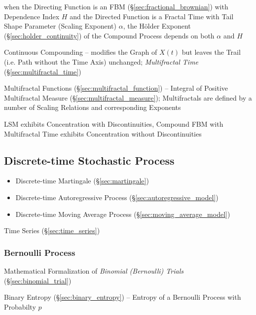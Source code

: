when the Directing Function is an FBM (\S\ref{sec:fractional_brownian}) with
Dependence Index $H$ and the Directed Function is a Fractal Time with Tail Shape
Parameter (Scaling Exponent) $\alpha$, the H\"older Exponent
(\S\ref{sec:holder_continuity}) of the Compound Process depends on both $\alpha$
and $H$

Continuous Compounding -- modifies the Graph of $X(t)$ but leaves the Trail
(i.e. Path without the Time Axis) unchanged; \emph{Multifractal Time}
(\S\ref{sec:multifractal_time})

Multifractal Functions (\S\ref{sec:multifractal_function}) -- Integral of
Positive Multifractal Measure (\S\ref{sec:multifractal_measure}); Multifractals
are defined by a number of Scaling Relations and corresponding Exponents

LSM exhibits Concentration with Discontinuities, Compound FBM with Multifractal
Time exhibits Concentration without Discontinuities



\subsection{Discrete-time Stochastic Process}\label{sec:discretetime_stochastic}

\begin{itemize}
  \item Discrete-time Martingale (\S\ref{sec:martingale})
  \item Discrete-time Autoregressive Process (\S\ref{sec:autoregressive_model})
  \item Discrete-time Moving Average Process (\S\ref{sec:moving_average_model})
\end{itemize}

\fist Time Series (\S\ref{sec:time_series})




\subsubsection{Bernoulli Process}\label{sec:bernoulli_process}

Mathematical Formalization of \emph{Binomial (Bernoulli) Trials}
(\S\ref{sec:binomial_trial})

Binary Entropy (\S\ref{sec:binary_entropy}) -- Entropy of a Bernoulli Process
with Probabilty $p$

